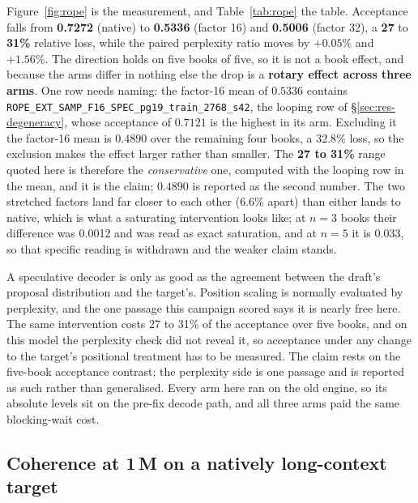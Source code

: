 \documentclass{article}
\begin{document}
Figure~\ref{fig:rope} is the measurement, and Table~\ref{tab:rope} the table. Acceptance falls from
\textbf{0.7272} (native) to \textbf{0.5336} (factor 16) and \textbf{0.5006} (factor 32), a \textbf{27} to \textbf{31\%} relative loss, while the paired
perplexity ratio moves by \textbf{$+0.05\%$} and \textbf{$+1.56\%$}. The direction holds on
five books of five, so it is not a book effect, and because the arms differ in nothing else
the drop is a \textbf{rotary effect across three arms}. One row needs naming: the factor-16
mean of $0.5336$ contains \texttt{ROPE\_EXT\_SAMP\_F16\_SPEC\_pg19\_train\_2768\_s42}, the
looping row of \S\ref{sec:res-degeneracy}, whose acceptance of $0.7121$ is the highest in its
arm. Excluding it the factor-16 mean is \textbf{$0.4890$} over the remaining four books, a
$32.8\%$ loss, so the exclusion makes the effect larger rather than smaller. The
\textbf{27 to 31\%} range quoted here is therefore the \emph{conservative} one, computed
with the looping row in the mean, and it is the claim; $0.4890$ is reported as the second
number. The two stretched factors land far closer to each other
(6.6\% apart) than either lands to native, which is what a saturating intervention looks like;
at $n{=}3$ books their difference was 0.0012 and was read as exact saturation, and at $n{=}5$
it is 0.033, so that specific reading is withdrawn and the weaker claim stands.

A speculative decoder is only as good as the agreement between the draft's proposal
distribution and the target's. Position scaling is normally evaluated by perplexity, and the
one passage this campaign scored says it is nearly free here. The same intervention costs 27
to 31\% of the acceptance over five books, and on this model the perplexity check did not
reveal it, so acceptance under any change to the target's positional treatment has to be
measured. The claim rests on the five-book acceptance contrast; the perplexity side is one
passage and is reported as such rather than generalised. Every arm here ran on the old engine,
so its absolute levels sit on the pre-fix decode path, and all three arms paid the same
blocking-wait cost.

\subsection{Coherence at 1\,M on a natively long-context target}
\label{sec:res-coherence}
\end{document}
